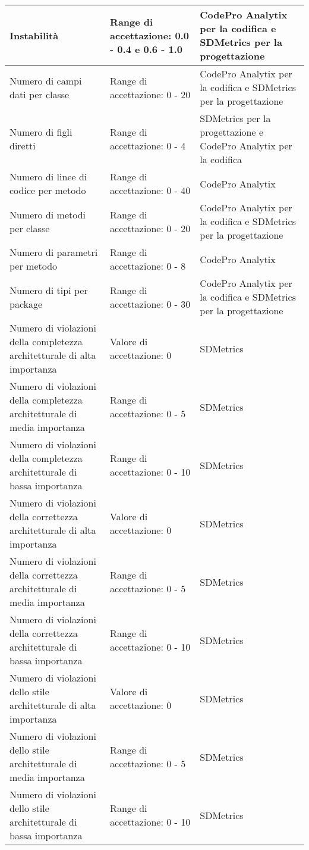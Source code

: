\begin{longtable}{|p{}|p{}|p{}|}
	\hline 
	Instabilità & Range di accettazione: 0.0 - 0.4 e 0.6 - 1.0 &  CodePro Analytix per la codifica e SDMetrics per la progettazione \\ 
	\hline 
	Numero di campi dati per classe & Range di accettazione: 0 - 20 &  CodePro Analytix per la codifica e SDMetrics per la progettazione \\ 
	\hline 
	Numero di figli diretti & Range di accettazione: 0 - 4 &  SDMetrics per la progettazione e CodePro Analytix per la codifica \\ 
	\hline 
	Numero di linee di codice per metodo & Range di accettazione: 0 - 40 &  CodePro Analytix \\ 
	\hline 
	Numero di metodi per classe & Range di accettazione: 0 - 20 &  CodePro Analytix per la codifica e SDMetrics per la progettazione \\ 
	\hline 
	Numero di parametri per metodo & Range di accettazione: 0 - 8 &  CodePro Analytix \\ 
	\hline 
	Numero di tipi per package & Range di accettazione: 0 - 30 &  CodePro Analytix per la codifica e SDMetrics per la progettazione \\ 
	\hline 
	Numero di violazioni della completezza architetturale di alta importanza & Valore di accettazione: 0 &  SDMetrics \\ 
	\hline 
	Numero di violazioni della completezza architetturale di media importanza & Range di accettazione: 0 - 5 &  SDMetrics \\ 
	\hline 
	Numero di violazioni della completezza architetturale di bassa importanza & Range di accettazione: 0 - 10 &  SDMetrics \\ 
	\hline 
	Numero di violazioni della correttezza architetturale di alta importanza & Valore di accettazione: 0 &  SDMetrics \\ 
	\hline 
	Numero di violazioni della correttezza architetturale di media importanza & Range di accettazione: 0 - 5 &  SDMetrics \\ 
	\hline 
	Numero di violazioni della correttezza architetturale di bassa importanza & Range di accettazione: 0 - 10 &  SDMetrics \\ 
	\hline 
	Numero di violazioni dello stile architetturale di alta importanza & Valore di accettazione: 0 &  SDMetrics \\ 
	\hline 
	Numero di violazioni dello stile architetturale di media importanza & Range di accettazione: 0 - 5 &  SDMetrics \\ 
	\hline 
	Numero di violazioni dello stile architetturale di bassa importanza & Range di accettazione: 0 - 10 &  SDMetrics \\ 

\end{longtable}
